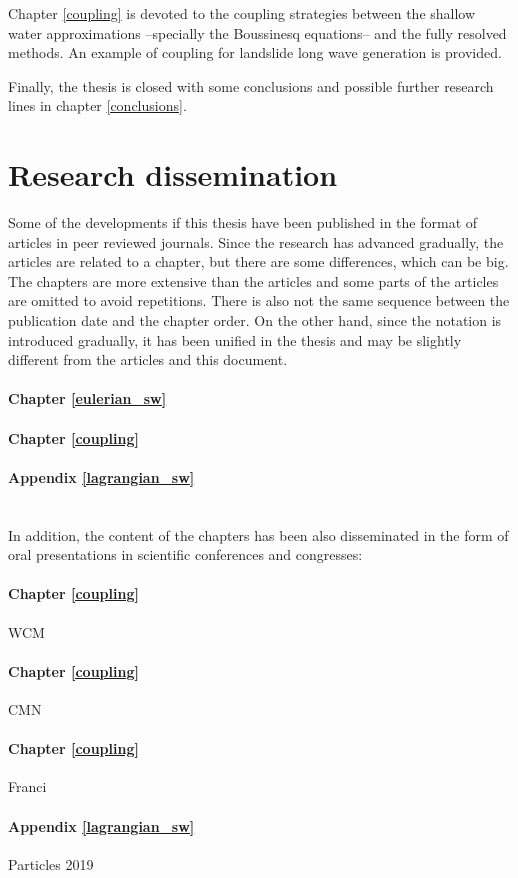 Chapter \ref{coupling} is devoted to the coupling strategies between the shallow water approximations --specially the Boussinesq equations-- and the fully resolved methods. An example of coupling for landslide long wave generation is provided.

Finally, the thesis is closed with some conclusions and possible further research lines in chapter \ref{conclusions}.







\section{Research dissemination}


Some of the developments if this thesis have been published in the format of articles in peer reviewed journals. Since the research has advanced gradually, the articles are related to a chapter, but there are some differences, which can be big.
The chapters are more extensive than the articles and some parts of the articles are omitted to avoid repetitions.
There is also not the same sequence between the publication date and the chapter order.
On the other hand, since the notation is introduced gradually, it has been unified in the thesis and may be slightly different from the articles and this document.

\paragraph{Chapter \ref{eulerian_sw}} 
\paragraph{Chapter \ref{coupling}} 
\paragraph{Appendix \ref{lagrangian_sw}} 
\\

In addition, the content of the chapters has been also disseminated in the form of oral presentations in scientific conferences and congresses:

\paragraph{Chapter \ref{coupling}} WCM
\paragraph{Chapter \ref{coupling}} CMN
\paragraph{Chapter \ref{coupling}} Franci
\paragraph{Appendix \ref{lagrangian_sw}} Particles 2019

